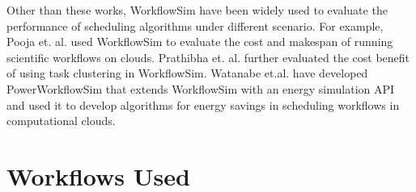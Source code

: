 Other than these works, WorkflowSim have been widely used to evaluate the performance of scheduling algorithms under different scenario. For example, Pooja et. al. \cite{pooja2013performance} used WorkflowSim to evaluate the cost and makespan of running scientific workflows on clouds. Prathibha et. al. \cite{prathibha2014monitoring} further evaluated the cost benefit of using task clustering in WorkflowSim. Watanabe et.al.\cite{pedro2014PowerWorkflowSim} have developed PowerWorkflowSim that extends WorkflowSim with an energy simulation API and used it to develop algorithms for energy savings in scheduling workflows in computational clouds. 


\section{Workflows Used}